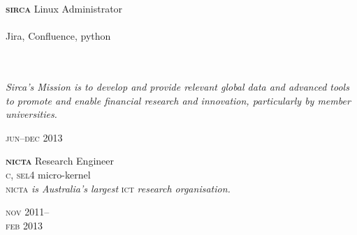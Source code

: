 \vspace{0.2in}

\begin{minipage}[t]{0.7\textwidth}
\textbf{\textsc{sirca}}\phantom{..} Linux Administrator \\
\\
Jira, Confluence, python
\\
\\
\\
{\small
\textit{Sirca’s Mission is to develop and provide relevant global data and advanced tools to promote and enable financial research and innovation, particularly by member universities.}
\par}
\end{minipage}
\begin{minipage}[t]{0.3\textwidth}
\hfill \textsc{jun}--\textsc{dec} 2013\\
\end{minipage}

\vspace{0.2in}

\begin{minipage}[t]{0.75\textwidth}
\textbf{\textsc{nicta}}\phantom{..} Research Engineer \\
\textsc{c}, \textsc{sel4} micro-kernel \\
{\small
\textsc{nicta}\textit{ is Australia's largest} \textsc{ict} \textit{research organisation.}
}
\end{minipage}
\begin{minipage}[t]{0.25\textwidth}
{
\hfill \textsc{nov} 2011--\\ 
\hspace*{0pt} \hfill \textsc{feb} 2013
\par
}
\end{minipage}






